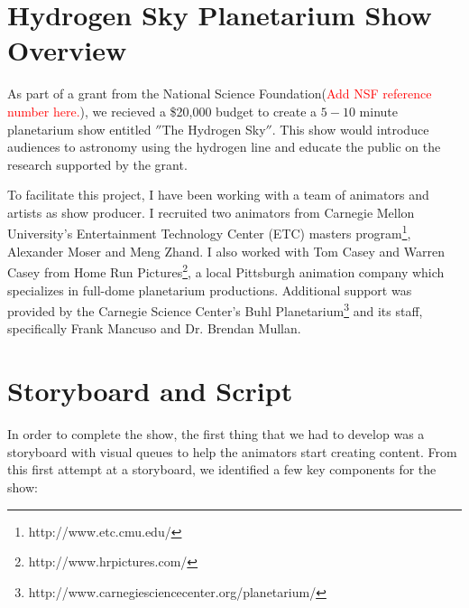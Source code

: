 \section{Hydrogen Sky Planetarium Show Overview}
As part of a grant from the National Science Foundation(\textcolor{red}{Add NSF reference number here.}), we recieved a \$20,000 budget to create a $5-10$ minute planetarium show entitled $''$The Hydrogen Sky$''$. This show would introduce audiences to astronomy using the \cm hydrogen line and educate the public on the research supported by the grant. 

To facilitate this project, I have been working with a team of animators and artists as show producer. I recruited two animators from Carnegie Mellon University's Entertainment Technology Center (ETC) masters program\footnote{http://www.etc.cmu.edu/}, Alexander Moser and Meng Zhand. I also worked with Tom Casey and Warren Casey from Home Run Pictures\footnote{http://www.hrpictures.com/}, a local Pittsburgh animation company which specializes in full-dome planetarium productions. Additional support was provided by the Carnegie Science Center's Buhl Planetarium\footnote{http://www.carnegiesciencecenter.org/planetarium/} and its staff, specifically Frank Mancuso and Dr. Brendan Mullan.

\section{Storyboard and Script}
In order to complete the show, the first thing that we had to develop was a storyboard with visual queues to help the animators start creating content. From this first attempt at a storyboard, we identified a few key components for the show:

